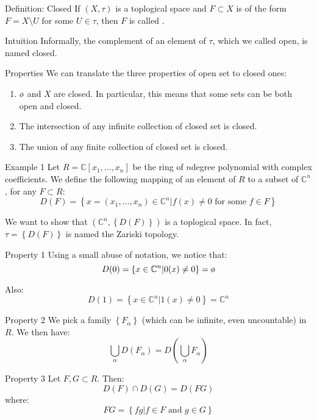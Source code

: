 \documentclass[a4paper]{article}
\begin{document}
\begin{parag}{Definition: Closed}
    If $\left(X, \tau\right)$ is a toplogical space and $F \subset X$ is of the form $F = X \setminus U$ for some $U \in \tau$, then $F$ is called .

    \begin{subparag}{Intuition}
        Informally, the complement of an element of $\tau$, which we called open, is named closed.
    \end{subparag}

    \begin{subparag}{Properties}
        We can translate the three properties of open set to closed ones:
        \begin{enumerate}
            \item $\o$ and $X$ are closed. In particular, this means that some sets can be both open and closed.
            \item The intersection of any infinite collection of closed set is closed.
            \item The union of any finite collection of closed set is closed.
        \end{enumerate}
    \end{subparag}
\end{parag}

\begin{parag}{Example 1}
    Let $R = \mathbb{C}\left[x_1, \ldots, x_n\right]$ be the ring of $n$\Th degree polynomial with complex coefficients. We define the following mapping of an element of $R$ to a subset of $\mathbb{C}^n$, for any $F \subset R$: 
    \[D\left(F\right) = \left\{x = \left(x_1, \ldots, x_n\right) \in \mathbb{C}^n | f\left(x\right) \neq 0 \text{ for some } f \in F\right\}\]

    We want to show that $\left(\mathbb{C}^n, \left\{D\left(F\right)\right\}\right)$ is a toplogical space. In fact, $\tau = \left\{D\left(F\right)\right\}$ is named the Zariski topology.
    
    \begin{subparag}{Property 1}
        Using a small abuse of notation, we notice that: 
        \[D\left(0\right) = \left\{x \in \mathbb{C}^n | 0\left(x\right) \neq 0\right\} = \o\]
        
        Also: 
        \[D\left(1\right) = \left\{x \in \mathbb{C}^n | 1\left(x\right) \neq 0\right\} = \mathbb{C}^n\]
    \end{subparag}
    
    \begin{subparag}{Property 2}
        We pick a family $\left\{F_{\alpha}\right\}$ (which can be infinite, even uncountable) in $R$. We then have: 
        \[\bigcup_{\alpha}^{} D\left(F_{\alpha}\right) = D\left(\bigcup_{\alpha}^{} F_{\alpha}\right)\]
    \end{subparag}
    
    \begin{subparag}{Property 3}
        Let $F, G \subset R$. Then: 
        \[D\left(F\right) \cap D\left(G\right) = D\left(FG\right)\]
        where: 
        \[FG = \left\{fg | f \in F \text{ and } g \in G\right\}\]
    \end{subparag}
\end{parag}
\end{document}
